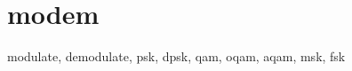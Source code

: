 % 
%

\section{modem}
\label{module:modem}
modulate, demodulate, psk, dpsk, qam, oqam, aqam, msk, fsk

